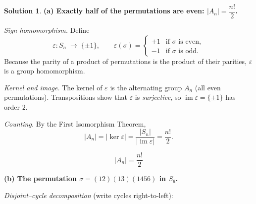 \documentclass[12pt]{article}
\theoremstyle{definition} %
\newtheorem{solution}{Solution}
\theoremstyle{plain} %
\begin{document}
                      \begin{solution}
                        \textbf{(a)  Exactly half of the permutations are even: \(\lvert A_{n}\rvert=\dfrac{n!}{2}\).}
                        
                        \smallskip
                        \emph{Sign homomorphism.}  
                        Define
                        \[
                        \varepsilon:S_{n}\;\longrightarrow\;\{\pm1\},\qquad
                        \varepsilon(\sigma)=
                          \begin{cases}
                             +1 &\text{if }\sigma\text{ is even},\\[-2pt]
                             -1 &\text{if }\sigma\text{ is odd}.
                          \end{cases}
                        \]
                        Because the parity of a product of permutations is the product of their
                        parities, \(\varepsilon\) is a group homomorphism.
                        
                        \smallskip
                        \emph{Kernel and image.}  
                        The kernel of \(\varepsilon\) is the alternating group
                        \(A_{n}\) (all even permutations).  
                        Transpositions show that \(\varepsilon\) is \emph{surjective}, so
                        \(\operatorname{im}\varepsilon=\{\pm1\}\) has order \(2\).
                        
                        \smallskip
                        \emph{Counting.}  
                        By the First Isomorphism Theorem,
                        \[
                        \lvert A_{n}\rvert
                           =\lvert\ker\varepsilon\rvert
                           =\frac{\lvert S_{n}\rvert}{\lvert\operatorname{im}\varepsilon\rvert}
                           =\frac{n!}{2}.
                        \]
                        
                        \[
                        \boxed{\;\lvert A_{n}\rvert=\dfrac{n!}{2}\;}
                        \]
                        
                        \bigskip
                        \textbf{(b)  The permutation \(\sigma=(12)(13)(1456)\) in \(S_{6}\).}
                        
                        \emph{Disjoint–cycle decomposition}  
                        (write cycles right-to-left):
                        

\end{solution}
\end{document}
